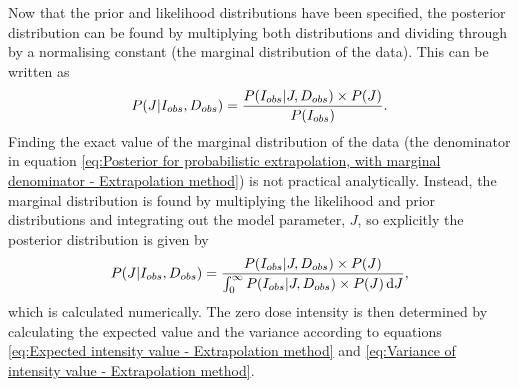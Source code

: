 Now that the prior and likelihood distributions have been specified, the posterior distribution can be found by multiplying both distributions and dividing through by a normalising constant (the marginal distribution of the data).
This can be written as
\begin{equation}
P(J|I_{obs},D_{obs}) = \frac{P(I_{obs} | J, D_{obs}) \times P(J)}{P(I_{obs})}.
\label{eq:Posterior for probabilistic extrapolation, with marginal denominator - Extrapolation method}
\end{equation}
Finding the exact value of the marginal distribution of the data (the denominator in equation \ref{eq:Posterior for probabilistic extrapolation, with marginal denominator - Extrapolation method}) is not practical analytically.
Instead, the marginal distribution is found by multiplying the likelihood and prior distributions and integrating out the model parameter, $J$, so explicitly the posterior distribution is given by
\begin{equation}
P(J|I_{obs},D_{obs}) = \frac{P(I_{obs} | J, D_{obs}) \times P(J)}{\int_0^{\infty} P(I_{obs} | J, D_{obs}) \times P(J)\, \mathrm{d}J},
\label{eq:Posterior for probabilistic extrapolation, explicit - Extrapolation method}
\end{equation}
which is calculated numerically.
The zero dose intensity is then determined by calculating the expected value and the variance according to equations \ref{eq:Expected intensity value - Extrapolation method} and \ref{eq:Variance of intensity value - Extrapolation method}.
